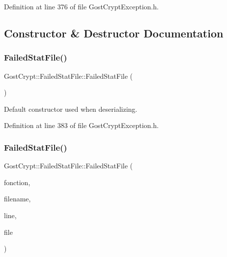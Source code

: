 Definition at line 376 of file Gost\+Crypt\+Exception.\+h.



\subsection{Constructor \& Destructor Documentation}
\mbox{\label{class_gost_crypt_1_1_failed_stat_file_af7d8cea5c9c77c192fd543df1d41511b}} 
\subsubsection{\texorpdfstring{Failed\+Stat\+File()}{FailedStatFile()}\hspace{0.1cm}{\footnotesize\ttfamily [1/2]}}
{\footnotesize\ttfamily Gost\+Crypt\+::\+Failed\+Stat\+File\+::\+Failed\+Stat\+File (\begin{DoxyParamCaption}{ }\end{DoxyParamCaption})\hspace{0.3cm}{\ttfamily [inline]}}



Default constructor used when deserializing. 



Definition at line 383 of file Gost\+Crypt\+Exception.\+h.

\mbox{\label{class_gost_crypt_1_1_failed_stat_file_ae5c894049b1a7240dee5140e6e87f9c5}} 
\subsubsection{\texorpdfstring{Failed\+Stat\+File()}{FailedStatFile()}\hspace{0.1cm}{\footnotesize\ttfamily [2/2]}}
{\footnotesize\ttfamily Gost\+Crypt\+::\+Failed\+Stat\+File\+::\+Failed\+Stat\+File (\begin{DoxyParamCaption}\item[{Q\+String}]{fonction,  }\item[{Q\+String}]{filename,  }\item[{quint32}]{line,  }\item[{Q\+File\+Info}]{file }\end{DoxyParamCaption})\hspace{0.3cm}{\ttfamily [inline]}}



